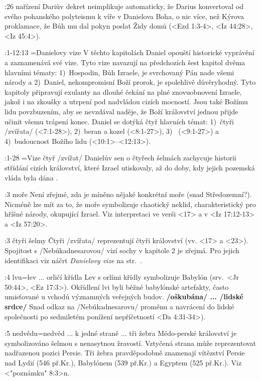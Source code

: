 :26 {nařízení} 
     Dariův dekret neimplikuje automaticky, že Darius konvertoval od svého
     pohanského polyteismu k víře v Danielova Boha, o nic více, než Kýrova proklamace, že Bůh mu
     dal pokyn poslat Židy domů (<Ezd 1:3-4>, <Iz 44:28>, <Iz 45:4>).

:1-12:13 {}={Danielovy vize} 
     V těchto kapitolách Daniel opouští historické vyprávění
     a zaznamenává své vize. Tyto vize navazují na předchozích šest kapitol dvěma hlavními tématy: 
     1)~Hospodin, Bůh Izraele, je svrchovaný Pán nade všemi národy a 
     2)~Daniel, nekompromisní Boží prorok, je spolehlivě důvěryhodný. Tyto kapitoly připravují exulanty na dlouhé čekání na plné znovuobnovení Izraele, jakož i na zkoušky a utrpení pod
        nadvládou cizích mocností. Jsou také Božímu lidu povzbuzením, aby se nevzdával naděje,
        že Boží království jednou přijde učinit všemu trápení konec. Daniel se dotýká čtyř
        hlavních témat: 1)~čtyři \x/zvířata/ (<7:1-28>),  
                        2)~beran a kozel (<8:1-27>),
                        3)~ (<9:1-27>) a 
                        4)~budoucnost Božího lidu (<10:1>--<12:13>).   

:1-28 {}={Vize čtyř \x/zvířat/}
     Danielův sen o čtyřech šelmách zachycuje historii střídání cizích
     království, které Izrael utiskovaly, až do doby, kdy jejich pozemská vláda byla dána 
     .

:3 {moře} 
     Není zřejmé, zda je míněno nějaké konkrétní moře (snad Středozemní?). Nicméně
     lze mít za to, že moře symbolizuje chaotický neklid, charakteristický pro hříšné národy,
     okupující Izrael. Viz interpretaci ve verši <17> a v <Iz 17:12-13> a <Iz 57:20>. 

:3 {čtyři šelmy}
    Čtyři \x/zvířata/ reprezentují čtyři království (vv. <17> a <23>).
    Spojitost  s \x/Nebúkadnesarovou/ vizí sochy v kapitole 2 je zřejmá. Pro jejich identifikaci viz náčrt 
    {\it Danielovy vize\/} na str.~\pgref[danielovavize]. 

:4 {lvu}={lev ... orličí křídla} 
     Lev s orlími křídly symbolizuje Babylón (srv.~<Jr 50:44>, <Ez 17:3>).
     Okřídlení lvi byli běžné babylónské artefakty, často umisťované u vchodů významných veřejných budov.      {\bf \x/oškubána/ ... \x/lidské srdce/} Snad odkaz na \x/Nebúkadnesarovu/
     proměnu a navrácení do lidské společnosti po sedmiletém ponížení nepříčetností
     <Da 4:31-34>).

:5 {nedvědu}={nedvěd ... k jedné straně ... tři žebra} 
     Médo-perské království je symbolizováno šelmou s nenasytnou žravostí. Vztyčená
     strana může reprezentovat nadřazenou pozici Persie. Tři žebra pravděpodobně znamenají
     vítězství Persie nad Lydií (546 př.Kr.), Babylónem (539 př.Kr.) a Egyptem (525 př.Kr.).
     Viz <"poznámku" 8:3>n.

